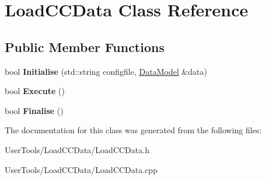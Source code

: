 \hypertarget{classLoadCCData}{
\section{LoadCCData Class Reference}
\label{classLoadCCData}
}
\subsection*{Public Member Functions}
\begin{DoxyCompactItemize}
\item 
\hypertarget{classLoadCCData_ad27ea87d892f247f70f8b96ca67329b1}{
bool {\bfseries Initialise} (std::string configfile, \hyperlink{classDataModel}{DataModel} \&data)}
\label{classLoadCCData_ad27ea87d892f247f70f8b96ca67329b1}

\item 
\hypertarget{classLoadCCData_a102f586b9ad192e73b037c764dfd22e0}{
bool {\bfseries Execute} ()}
\label{classLoadCCData_a102f586b9ad192e73b037c764dfd22e0}

\item 
\hypertarget{classLoadCCData_adab5adee6f15c924a7077d63227e623c}{
bool {\bfseries Finalise} ()}
\label{classLoadCCData_adab5adee6f15c924a7077d63227e623c}

\end{DoxyCompactItemize}


The documentation for this class was generated from the following files:\begin{DoxyCompactItemize}
\item 
UserTools/LoadCCData/LoadCCData.h\item 
UserTools/LoadCCData/LoadCCData.cpp\end{DoxyCompactItemize}
